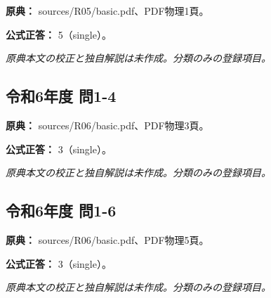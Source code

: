 \noindent\textbf{原典：} sources/R05/basic.pdf、PDF物理1頁。

\textbf{公式正答：} 5（single）。

\par\textit{原典本文の校正と独自解説は未作成。分類のみの登録項目。}

\subsection{令和6年度 問1-4}
\label{q:r06-reg-basic-1-4}

\noindent\textbf{原典：} sources/R06/basic.pdf、PDF物理3頁。

\textbf{公式正答：} 3（single）。

\par\textit{原典本文の校正と独自解説は未作成。分類のみの登録項目。}

\subsection{令和6年度 問1-6}
\label{q:r06-reg-basic-1-6}

\noindent\textbf{原典：} sources/R06/basic.pdf、PDF物理5頁。

\textbf{公式正答：} 3（single）。

\par\textit{原典本文の校正と独自解説は未作成。分類のみの登録項目。}
